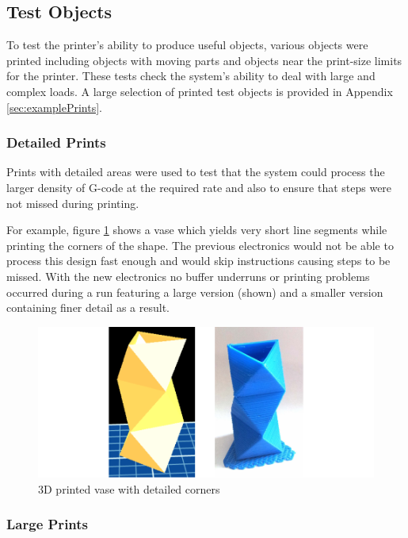 		
		\subsection{Test Objects}
			
			To test the printer's ability to produce useful objects, various objects
			were printed including objects with moving parts and objects near the
			print-size limits for the printer. These tests check the system's ability
			to deal with large and complex loads. A large selection of printed test
			objects is provided in Appendix \ref{sec:examplePrints}.
			
			\subsubsection{Detailed Prints}
				
				Prints with detailed areas were used to test that the system could
				process the larger density of G-code at the required rate and also to
				ensure that steps were not missed during printing.
				
				For example, figure \ref{fig:vase} shows a vase which yields very short
				line segments while printing the corners of the shape. The previous
				electronics would not be able to process this design fast enough and
				would skip instructions causing steps to be missed. With the new
				electronics no buffer underruns or printing problems occurred during a
				run featuring a large version (shown) and a smaller version containing
				finer detail as a result.
				
				\begin{figure}
					\includegraphics[width=1\textwidth]{diagrams/vase.pdf}
					\caption{3D printed vase with detailed corners}
					\label{fig:vase}
				\end{figure}
			
			\subsubsection{Large Prints}
				
